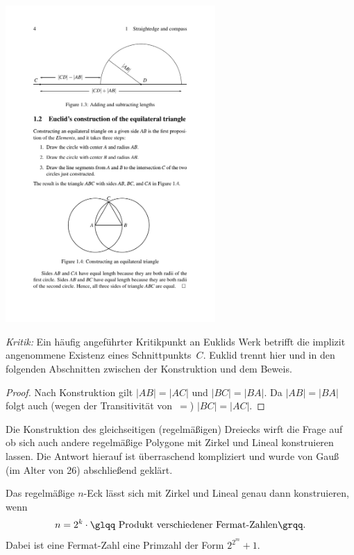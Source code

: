 \centerline{\includegraphics[width=8cm]{BILDER/BildKonstruktionGleichseitigesDreieck.pdf}}


{\em Kritik:}
Ein häufig angeführter Kritikpunkt an Euklids Werk betrifft die 
implizit angenommene Existenz eines Schnittpunkts~$C$.
%
Euklid trennt hier und in den folgenden Abschnitten 
zwischen der Konstruktion und dem Beweis.

\begin{proof}
Nach Konstruktion gilt $|AB|=|AC|$
und $|BC|=|BA|$. Da $|AB|=|BA|$ folgt auch (wegen der Transitivität
von~\glqq $=$\grqq )
$|BC|=|AC|$.
\end{proof}


Die Konstruktion des gleichseitigen (regelmäßigen) Dreiecks wirft die
Frage auf ob sich auch andere regelmäßige Polygone mit Zirkel und
Lineal konstruieren lassen. Die Antwort hierauf ist überraschend
kompliziert und wurde von Gauß (im Alter von 26) %
abschließend geklärt.
%
%

\begin{thm}[Gauß, 1801]  %
Das regelmäßige $n$-Eck lässt sich mit Zirkel und Lineal
genau dann konstruieren, wenn
$$
n = 2^k \cdot \mbox{\glqq Produkt verschiedener Fermat-Zahlen\grqq}.
$$
Dabei ist eine Fermat-Zahl eine Primzahl der Form $2^{2^m}+1$.
\end{thm}

